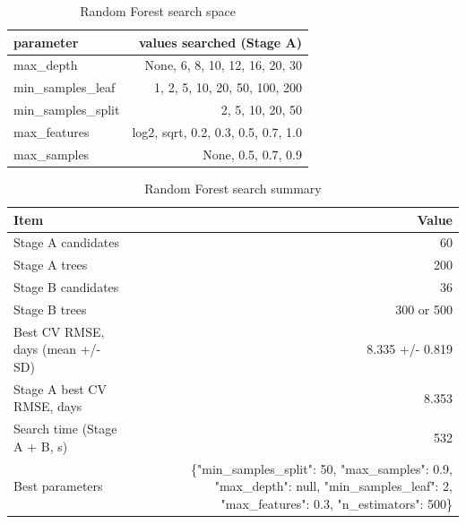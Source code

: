\begin{table}[htbp]
\centering
\small
\caption{Random Forest search space}
\begin{tabular}{lr}
\toprule
parameter & values searched (Stage A) \\
\midrule
max\_depth & None, 6, 8, 10, 12, 16, 20, 30 \\
min\_samples\_leaf & 1, 2, 5, 10, 20, 50, 100, 200 \\
min\_samples\_split & 2, 5, 10, 20, 50 \\
max\_features & log2, sqrt, 0.2, 0.3, 0.5, 0.7, 1.0 \\
max\_samples & None, 0.5, 0.7, 0.9 \\
\bottomrule
\end{tabular}
\par\smallskip\begin{minipage}{\linewidth}\footnotesize \end{minipage}
\end{table}


\begin{table}[htbp]
\centering
\small
\caption{Random Forest search summary}
\begin{tabular}{lr}
\toprule
Item & Value \\
\midrule
Stage A candidates & 60 \\
Stage A trees & 200 \\
Stage B candidates & 36 \\
Stage B trees & 300 or 500 \\
Best CV RMSE, days (mean +/- SD) & 8.335 +/- 0.819 \\
Stage A best CV RMSE, days & 8.353 \\
Search time (Stage A + B, s) & 532 \\
Best parameters & \{"min\_samples\_split": 50, "max\_samples": 0.9, "max\_depth": null, "min\_samples\_leaf": 2, "max\_features": 0.3, "n\_estimators": 500\} \\
\bottomrule
\end{tabular}
\par\smallskip\begin{minipage}{\linewidth}\footnotesize \end{minipage}
\end{table}


